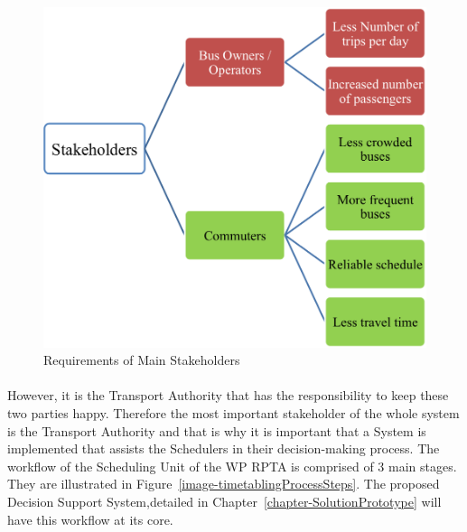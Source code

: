\begin {figure} [H]
\centering
\includegraphics[scale=0.7]{mainStakeholdersDiagram}
\caption [Requirements of Main Stakeholders] {Requirements of Main Stakeholders}
\label {image-mainStakeholdersDiagram}
\end {figure}

\paragraph{} However, it is the Transport Authority that has the responsibility to keep these two parties happy. Therefore the most important stakeholder of the whole system is the Transport Authority and that is why it is important that a System is implemented that assists the Schedulers in their decision-making process. The workflow of the Scheduling Unit of the WP RPTA is comprised of 3 main stages. They are illustrated in Figure~\ref{image-timetablingProcessSteps}. The proposed Decision Support System,detailed in Chapter~\ref{chapter-SolutionPrototype} will have this workflow at its core.

